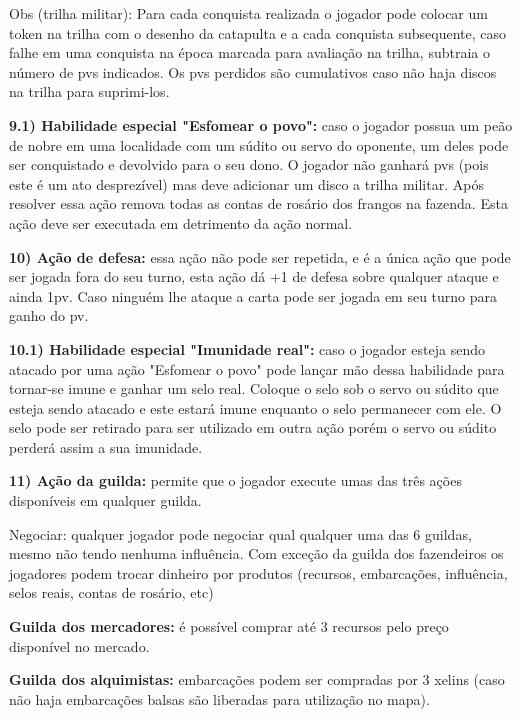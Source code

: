 \documentclass[11pt]{article}
\begin{document}
Obs (trilha militar): Para cada conquista realizada o jogador pode colocar um token na trilha com o desenho da catapulta e a cada conquista subsequente, caso falhe em uma conquista na época marcada para avaliação na trilha,
 subtraia o número de pvs indicados. Os pvs perdidos são cumulativos caso não haja discos na trilha para suprimi-los.

\textbf{9.1) Habilidade especial "Esfomear o povo":} caso o jogador possua um peão de nobre em uma localidade com um súdito ou servo do oponente, um deles pode ser conquistado e devolvido para o seu dono. O jogador não ganhará pvs
(pois este é um ato desprezível) mas deve adicionar um disco a trilha militar. Após resolver essa ação remova todas as contas de rosário dos frangos na fazenda. Esta ação deve ser executada em detrimento da ação normal.

\textbf{10) Ação de defesa:} essa ação não pode ser repetida, e é a única ação que pode ser jogada fora do seu turno, esta ação dá +1 de defesa sobre qualquer ataque e ainda 1pv. Caso ninguém lhe ataque a carta pode ser jogada em seu
turno para ganho do pv.

\textbf{10.1) Habilidade especial "Imunidade real":} caso o jogador esteja sendo atacado por uma ação "Esfomear o povo" pode lançar mão dessa habilidade para tornar-se imune e ganhar um selo real. Coloque o selo sob o servo ou súdito
que esteja sendo atacado e este estará imune enquanto o selo permanecer com ele. O selo pode ser retirado para ser utilizado em outra ação porém o servo ou súdito perderá assim a sua imunidade.

\textbf{11) Ação da guilda:} permite que o jogador execute umas das três ações disponíveis em qualquer guilda.

Negociar: qualquer jogador pode negociar qual qualquer uma das 6 guildas, mesmo não tendo nenhuma influência. Com exceção da guilda dos fazendeiros os jogadores podem trocar dinheiro por produtos (recursos, embarcações, influência,
selos reais, contas de rosário, etc)

\textbf{Guilda dos mercadores:} é possível comprar até 3 recursos pelo preço disponível no mercado.

\textbf{Guilda dos alquimistas:} embarcações podem ser compradas por 3 xelins (caso não haja embarcações balsas são liberadas para utilização no mapa).
\end{document}
